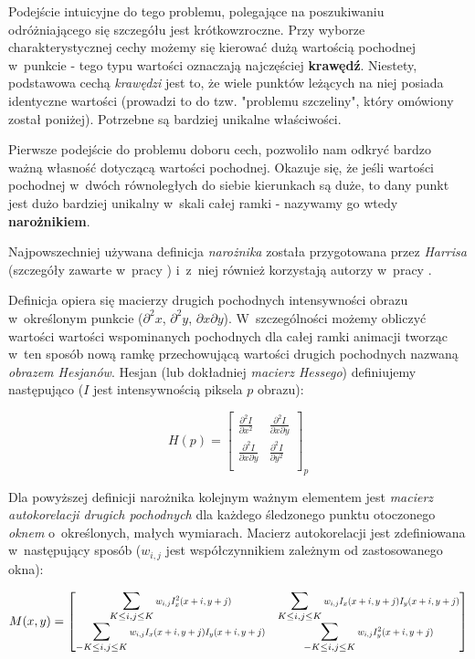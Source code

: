     Podejście intuicyjne do tego problemu, polegające na poszukiwaniu odróżniającego się szczegółu jest krótkowzroczne. Przy wyborze charakterystycznej cechy możemy się kierować dużą wartością pochodnej w~punkcie - tego typu wartości oznaczają najczęściej \textbf{krawędź}. Niestety, podstawowa cechą \textit{krawędzi} jest to, że wiele punktów leżących na niej posiada identyczne wartości (prowadzi to do tzw. "problemu szczeliny", który omówiony został poniżej). Potrzebne są bardziej unikalne właściwości.

    Pierwsze podejście do problemu doboru cech, pozwoliło nam odkryć bardzo ważną własność dotyczącą wartości pochodnej. Okazuje się, że jeśli wartości pochodnej w~dwóch równoległych do siebie kierunkach są duże, to dany punkt jest dużo bardziej unikalny w~skali całej ramki - nazywamy go wtedy \textbf{narożnikiem}.

    Najpowszechniej używana definicja \textit{narożnika} została przygotowana przez \textit{Harrisa} (szczegóły zawarte w~pracy \cite{Harris88}) i~z~niej również korzystają autorzy w~pracy \cite{GoodFeaturesToTrack94}.

    Definicja opiera się macierzy drugich pochodnych intensywności obrazu w~określonym punkcie ($\partial^2 x$, $\partial^2 y$, $\partial x\partial y$). W~szczególności możemy obliczyć wartości wartości wspominanych pochodnych dla całej ramki animacji tworząc w~ten sposób nową ramkę przechowującą wartości drugich pochodnych nazwaną \textit{obrazem Hesjanów}. Hesjan (lub dokładniej \textit{macierz Hessego}) definiujemy następująco ($I$ jest intensywnością piksela $p$ obrazu):

    \[
      H(p) =
        \begin{bmatrix}
          \frac{\partial^2 I}{\partial x^2} & \frac{\partial^2 I}{\partial x\partial y} \\
          \frac{\partial^2 I}{\partial x\partial y} & \frac{\partial^2 I}{\partial y^2} \\
        \end{bmatrix}_{p}
    \]

    Dla powyższej definicji narożnika kolejnym ważnym elementem jest \textit{macierz autokorelacji drugich pochodnych} dla każdego śledzonego punktu otoczonego \textit{oknem} o~określonych, małych wymiarach. Macierz autokorelacji jest zdefiniowana w~następujący sposób ($w_{i,j}$ jest współczynnikiem zależnym od zastosowanego okna):

    \[
      M(x, y) =
        \begin{bmatrix}
            \displaystyle\sum\limits_{K \le i, j \le K}
              \scalemath{0.75}{w_{i,j} I_{x}^{2} (x + i, y + j)} &
            \displaystyle\sum\limits_{K \le i, j \le K}
              \scalemath{0.75}{w_{i,j} I_{x} (x + i, y + j) I_{y} (x + i, y + j)} \\

            \displaystyle\sum\limits_{-K \le i, j \le K}
              \scalemath{0.75}{w_{i,j} I_{x} (x + i, y + j) I_{y} (x + i, y + j)} &
            \displaystyle\sum\limits_{-K \le i, j \le K}
              \scalemath{0.75}{w_{i,j} I_{y}^{2} (x + i, y + j)} \\
        \end{bmatrix}
    \]


